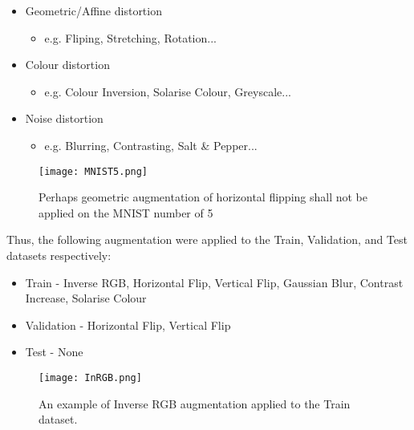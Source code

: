 \documentclass[11pt, a4paper, twoside]{report}
\begin{document}
\begin{itemize}
  \item Geometric/Affine distortion
    \begin{itemize}
      \item e.g. Fliping, Stretching, Rotation...
    \end{itemize}
\end{itemize}
\begin{itemize}
  \item Colour distortion
    \begin{itemize}
      \item e.g. Colour Inversion, Solarise Colour, Greyscale...
    \end{itemize}
\end{itemize}
\begin{itemize}
  \item Noise distortion
    \begin{itemize}
      \item e.g. Blurring, Contrasting, Salt \& Pepper...
    \end{itemize}
\end{itemize}


\begin{figure}[H]
  \centering
  \texttt{[image: MNIST5.png]}
  \caption{Perhaps geometric augmentation of horizontal flipping shall not be applied on the MNIST number of 5}
  \label{fig:MNIST5}
\end{figure}

Thus, the following augmentation were applied to the Train, Validation, and Test datasets respectively:

\begin{itemize}
  \item Train - Inverse RGB, Horizontal Flip, Vertical Flip, Gaussian Blur, Contrast Increase, Solarise Colour
  \item Validation - Horizontal Flip, Vertical Flip
  \item Test - None
\end{itemize}

\begin{figure}[H]
  \centering
  \texttt{[image: InRGB.png]}
  \caption{An example of Inverse RGB augmentation applied to the Train dataset.}
  \label{fig:InRGB}
\end{figure}
\end{document}

